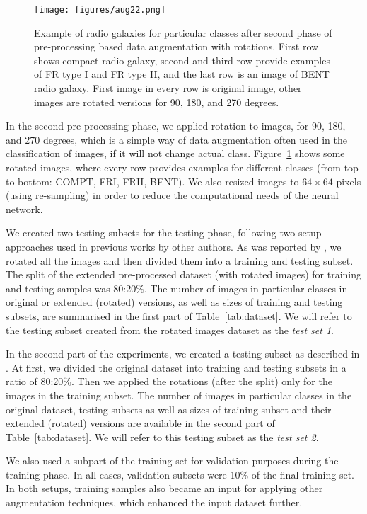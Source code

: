 \documentclass[fleqn,usenatbib]{mnras}
\begin{document}
\begin{figure}
    \centering
    \texttt{[image: figures/aug22.png]}
    \caption{Example of radio galaxies for particular classes after second phase of pre-processing based data augmentation with rotations. First row shows compact radio galaxy, second and third row provide examples of FR type I and FR type II, and the last row is an image of BENT radio galaxy. First image in every row is original image, other images are rotated versions for 90, 180, and 270 degrees.}
    \label{fig:rotate}
\end{figure}

In the second pre-processing phase, we applied rotation to images, for 90, 180, and 270 degrees, which is a simple way of data augmentation often used in the classification of images, if it will not change actual class. Figure~\ref{fig:rotate} shows some rotated images, where every row provides examples for different classes (from top to bottom: COMPT, FRI, FRII, BENT). We also resized images to  $64\times64$ pixels (using re-sampling) in order to reduce the computational needs of the neural network.


We created two testing subsets for the testing phase, following two setup approaches used in previous works by other authors. As was reported by \cite{2}, we rotated all the images and then divided them into a training and testing subset. The split of the extended pre-processed dataset (with rotated images) for training and testing samples was 80:20\%. The number of images in particular classes in original or extended (rotated) versions, as well as sizes of training and testing subsets, are summarised in the first part of Table~\ref{tab:dataset}. We will refer to the testing subset created from the rotated images dataset as the \textit{test set 1}.

In the second part of the experiments, we created a testing subset as described in \cite{3, Lukic_2018, 1}. At first, we divided the original dataset into training and testing subsets in a ratio of 80:20\%. Then we applied the rotations (after the split) only for the images in the training subset. The number of images in particular classes in the original dataset, testing subsets as well as sizes of training subset and their extended (rotated) versions are available in the second part of Table~\ref{tab:dataset}. We will refer to this testing subset as the \textit{test set 2}. 

We also used a subpart of the training set for validation purposes during the training phase. In all cases, validation subsets were 10\% of the final training set. In both setups, training samples also became an input for applying other augmentation techniques, which enhanced the input dataset further.
 
\end{document}
